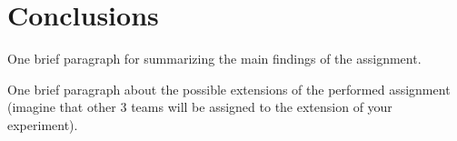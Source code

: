 \section{Conclusions}\label{sec:conclusions}

One brief paragraph for summarizing the main findings of the assignment.

One brief paragraph about the possible extensions of the performed assignment (imagine that other 3 teams will be assigned to the extension of your experiment).   